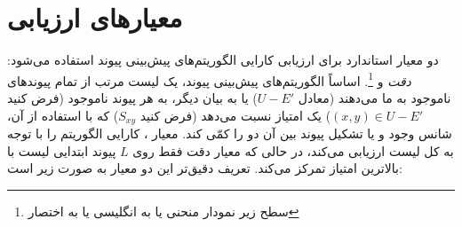 \section{معیارهای ارزیابی}\label{subsec:evalu}
دو معیار استاندارد برای ارزیابی کارایی الگوریتم‌های پیش‌بینی پیوند استفاده می‌شود: \textit{دقت} و \textit{}\footnote{سطح زیر نمودار منحنی  یا به انگلیسی  یا به اختصار }\cite{hanley1982meaning}. اساساً الگوریتم‌های پیش‌بینی پیوند، یک لیست مرتب از تمام پیوند‌های ناموجود به ما می‌دهند (معادل $U-E'$) یا به بیان دیگر، به هر پیوند ناموجود (فرض کنید $(x,y)\in U-E'$) یک امتیاز نسبت می‌دهد (فرض کنید $S_{xy}$) که با استفاده از آن، شانس وجود و یا تشکیل پیوند بین آن دو را کمّی کند. معیار ، کارایی الگوریتم را با توجه به کل لیست ارزیابی می‌کند، در حالی که معیار دقت فقط روی $L$ پیوند ابتدایی لیست با بالاترین امتیاز تمرکز می‌کند. تعریف دقیق‌تر این دو معیار به صورت زیر است:
